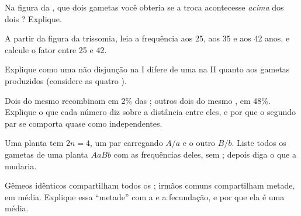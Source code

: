 \begin{exercise}[$\star\star$]\label{exo:g12:meiosis-genetic-shuffling:9}
Na figura da , que dois gametas você obteria se a troca
acontecesse \emph{acima} dos dois ? Explique.
\end{exercise}

\begin{exercise}[$\star\star$]\label{exo:g12:meiosis-genetic-shuffling:10}
A partir da figura da trissomia, leia a frequência aos 25, aos 35 e aos
42 anos, e calcule o fator entre 25 e 42.
\end{exercise}

\begin{exercise}[$\star\star$]\label{exo:g12:meiosis-genetic-shuffling:11}
Explique como uma não disjunção na  I difere de uma na  II
quanto aos gametas produzidos (considere as quatro ).
\end{exercise}

\begin{exercise}[$\star\star\star$]\label{exo:g12:meiosis-genetic-shuffling:12}
Dois  do mesmo  recombinam em 2\% das ; outros
dois do mesmo , em 48\%. Explique o que cada número diz sobre
a distância entre eles, e por que o segundo par se comporta quase como
 independentes.
\end{exercise}

\begin{exercise}[$\star\star\star$]\label{exo:g12:meiosis-genetic-shuffling:13}
Uma planta tem $2n = 4$, um par carregando $A/a$ e o outro $B/b$.
Liste todos os gametas de uma planta $AaBb$ com as frequências deles,
sem ; depois diga o que a  mudaria.
\end{exercise}

\begin{exercise}[$\star\star\star$]\label{exo:g12:meiosis-genetic-shuffling:14}
Gêmeos idênticos compartilham todos os ; irmãos comuns
compartilham metade, em média. Explique essa ``metade'' com a  e
a fecundação, e por que ela é uma média.
\end{exercise}


